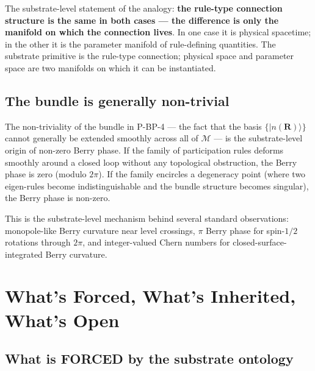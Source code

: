 \documentclass[11pt,a4paper]{article}
\begin{document}
The substrate-level statement of the analogy: \textbf{the rule-type connection structure is the same in both cases --- the difference is only the manifold on which the connection lives}. In one case it is physical spacetime; in the other it is the parameter manifold of rule-defining quantities. The substrate primitive is the rule-type connection; physical space and parameter space are two manifolds on which it can be instantiated.

\subsection{The bundle is generally non-trivial}

The non-triviality of the bundle in P-BP-4 --- the fact that the basis $\{|n(\mathbf{R})\rangle\}$ cannot generally be extended smoothly across all of $\mathcal{M}$ --- is the substrate-level origin of non-zero Berry phase. If the family of participation rules deforms smoothly around a closed loop without any topological obstruction, the Berry phase is zero (modulo $2\pi$). If the family encircles a degeneracy point (where two eigen-rules become indistinguishable and the bundle structure becomes singular), the Berry phase is non-zero.

This is the substrate-level mechanism behind several standard observations: monopole-like Berry curvature near level crossings, $\pi$ Berry phase for spin-$1/2$ rotations through $2\pi$, and integer-valued Chern numbers for closed-surface-integrated Berry curvature.

\section{What's Forced, What's Inherited, What's Open}

\subsection*{What is FORCED by the substrate ontology}
\end{document}
